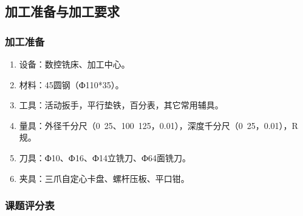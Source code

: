 \vfill
\subsection{加工准备与加工要求}
\subsubsection{加工准备}
\begin{enumerate}[1、]
	\item 设备：数控铣床、加工中心。
	\item 材料：45圆钢（Ф110*35）。
	\item 工具：活动扳手，平行垫铁，百分表，其它常用辅具。
	\item 量具：外径千分尺（0~25、100~125，0.01），深度千分尺（0~25，0.01），R规。
	\item 刀具：Ф10、Ф16、Ф14立铣刀、Ф64面铣刀。
	\item 夹具：三爪自定心卡盘、螺杆压板、平口钳。
\end{enumerate}
\subsubsection{课题评分表}

